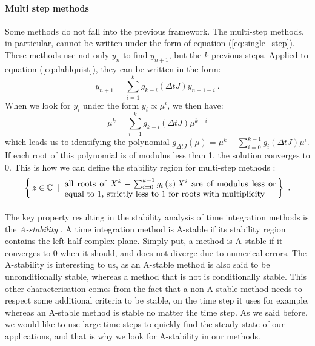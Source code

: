         \paragraph{Multi step methods}
        Some methods do not fall into the previous framework.
        The multi-step methods, in particular, cannot be written under the form of equation (\ref{eq:single_step}).
        These methods use not only $y_n$ to find $y_{n+1}$, but the $k$ previous steps.
        Applied to equation (\ref{eq:dahlquist}), they can be written in the form:
        \begin{equation}
          y_{n+1} = \sum_{i=1}^k g_{k-i}\left(\Delta t J\right) y_{n+1-i} \ .
        \end{equation}
        When we look for $y_i$ under the form $y_i \propto \mu^{i}$, we then have:
        \begin{equation}
          \mu^k = \sum_{i=1}^k g_{k-i}\left(\Delta t J\right) \mu^{k-i}
        \end{equation}
        which leads us to identifying the polynomial $g_{\Delta t J}\left(\mu\right) = \mu^k - \sum_{i=0}^{k-1}g_i\left(\Delta t J\right)\mu^i$.
        If each root of this polynomial is of modulus less than 1, the solution converges to 0.
        This is how we can define the stability region for multi-step methods \cite{HairerWanner1996}:
        \begin{equation}
          \left\{ \, z \in \mathbb{C} \; \mid \; \parbox{25em}{all roots of $X^k - \sum_{i=0}^{k-1}g_i\left(z\right)X^i$ are of modulus less or equal to 1, strictly less to 1 for roots with multiplicity}
           \, \right \} \ .
        \end{equation}

        \paragraph{}
        The key property resulting in the stability analysis of time integration methods is the \emph{A-stability} \cite{Dahlquist1963}.
        A time integration method is A-stable if its stability region contains the left half complex plane.
        Simply put, a method is A-stable if it converges to 0 when it should, and does not diverge due to numerical errors.
        The A-stability is interesting to us, as an A-stable method is also said to be unconditionally stable, whereas a method that is not is conditionally stable.
        This other characterisation comes from the fact that a non-A-stable method needs to respect some additional criteria to be stable, on the time step it uses for example, whereas an A-stable method is stable no matter the time step.
        As we said before, we would like to use large time steps to quickly find the steady state of our applications, and that is why we look for A-stability in our methods.



